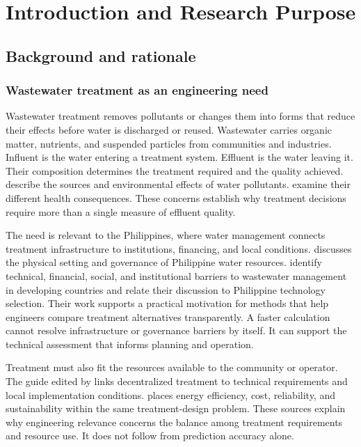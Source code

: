 \chapter{Introduction and Research Purpose}
\label{ch:introduction}

\section{Background and rationale}

\subsection{Wastewater treatment as an engineering need}

Wastewater treatment removes pollutants or changes them into forms that reduce their effects before water is discharged or reused. Wastewater carries organic matter, nutrients, and suspended particles from communities and industries. Influent is the water entering a treatment system. Effluent is the water leaving it. Their composition determines the treatment required and the quality achieved. \citet{Madhav2019} describe the sources and environmental effects of water pollutants. \citet{Lin2022} examine their different health consequences. These concerns establish why treatment decisions require more than a single measure of effluent quality.

The need is relevant to the Philippines, where water management connects treatment infrastructure to institutions, financing, and local conditions. \citet{Tabios2020} discusses the physical setting and governance of Philippine water resources. \citet{DamalerioBarriers2022} identify technical, financial, social, and institutional barriers to wastewater management in developing countries and relate their discussion to Philippine technology selection. Their work supports a practical motivation for methods that help engineers compare treatment alternatives transparently. A faster calculation cannot resolve infrastructure or governance barriers by itself. It can support the technical assessment that informs planning and operation.

Treatment must also fit the resources available to the community or operator. The guide edited by \citet{Ulrich2009} links decentralized treatment to technical requirements and local implementation conditions. \citet{Jafarinejad2020} places energy efficiency, cost, reliability, and sustainability within the same treatment-design problem. These sources explain why engineering relevance concerns the balance among treatment requirements and resource use. It does not follow from prediction accuracy alone.

